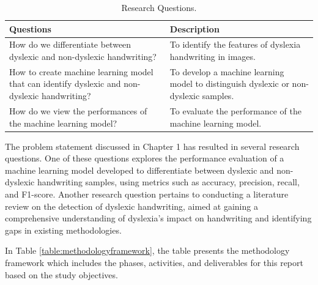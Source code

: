 \begin{longtable}{|p{5cm}|p{7.5cm}|}
\caption{Research Questions.} \label{table:researchquestions}\\
\hline
\textbf{Questions} & \textbf{Description} \\ [0.5ex] 
\hline
\endfirsthead
\hline
\endhead
\hline
\endfoot
\endlastfoot
How do we differentiate between dyslexic and non-dyslexic handwriting? & To identify the features of dyslexia handwriting in images. \\
\hline
How to create machine learning model that can identify dyslexic and non-dyslexic handwriting? & To develop a machine learning model to distinguish dyslexic or non-dyslexic samples. \\
\hline
How do we view the performances of the machine learning model? & To evaluate the performance of the machine learning model. \\
\hline
\end{longtable}
 The problem statement discussed in Chapter 1 has resulted in several research questions. One of these questions explores the performance evaluation of a machine learning model developed to differentiate between dyslexic and non-dyslexic handwriting samples, using metrics such as accuracy, precision, recall, and F1-score. Another research question pertains to conducting a literature review on the detection of dyslexic handwriting, aimed at gaining a comprehensive understanding of dyslexia's impact on handwriting and identifying gaps in existing methodologies. 

\newpage
In Table \ref{table:methodologyframework}, the table presents the methodology framework which includes the phases, activities, and deliverables for this report based on the study objectives.


